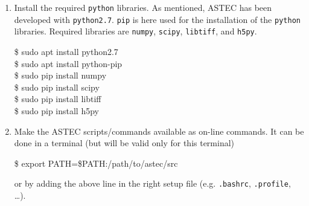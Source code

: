 \begin{enumerate}
\item Install the required \texttt{python} libraries. As mentioned,
  ASTEC has been developed with \texttt{python2.7}. \texttt{pip} is
  here used for the installation of the \texttt{python}
  libraries. Required libraries are \texttt{numpy}, \texttt{scipy},
  \texttt{libtiff}, and \texttt{h5py}.
  \begin{code}{0.8}
    \$ sudo apt install python2.7 \\
    \$ sudo apt install python-pip \\
    \$ sudo pip install numpy \\
    \$ sudo pip install scipy \\
    \$ sudo pip install libtiff \\
    \$ sudo pip install h5py \\
  \end{code}

\item Make the ASTEC scripts/commands available as on-line commands.
It can be done in a terminal (but will be valid only for this terminal)
\begin{code}{0.8}
  \$ export PATH=\${PATH}:/path/to/astec/src
\end{code}
or by adding the above line in the right setup file (e.g. \texttt{.bashrc}, \texttt{.profile}, \ldots).

\end{enumerate}










